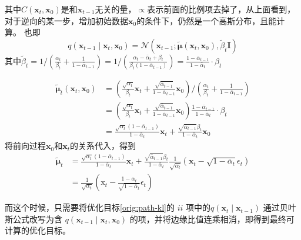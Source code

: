 其中$C\left(\mathbf{x}_t, \mathbf{x}_0\right)$是和$\mathbf{x}_{t-1}$无关的量，$\propto $表示前面的比例项去掉了，从上面看到，对于逆向的某一步，增加初始数据$\mathbf{x}_0$的条件下，仍然是一个高斯分布，且能计算。
也即
\begin{equation}
q\left(\mathbf{x}_{t-1} \mid \mathbf{x}_t, \mathbf{x}_0\right)=\mathcal{N}\left(\mathbf{x}_{t-1} ; \tilde{\boldsymbol{\mu}}\left(\mathbf{x}_t, \mathbf{x}_0\right), \tilde{\beta}_t \mathbf{I}\right)
\end{equation}
其中$\tilde{\beta}_t=1 /\left(\frac{\alpha_t}{\beta_t}+\frac{1}{1-\bar{\alpha}_{t-1}}\right)=1 /\left(\frac{\alpha_t-\bar{\alpha}_t+\beta_t}{\beta_t\left(1-\bar{\alpha}_{t-1}\right)}\right)=\frac{1-\bar{\alpha}_{t-1}}{1-\bar{\alpha}_t} \cdot \beta_t$

\begin{equation}
\begin{aligned}
\tilde{\boldsymbol{\mu}}_t\left(\mathbf{x}_t, \mathbf{x}_0\right) & =\left(\frac{\sqrt{\alpha_t}}{\beta_t} \mathbf{x}_t+\frac{\sqrt{\bar{\alpha}_{t-1}}}{1-\bar{\alpha}_{t-1}} \mathbf{x}_0\right) /\left(\frac{\alpha_t}{\beta_t}+\frac{1}{1-\bar{\alpha}_{t-1}}\right) \\
& =\left(\frac{\sqrt{\alpha_t}}{\beta_t} \mathbf{x}_t+\frac{\sqrt{\bar{\alpha}_{t-1}}}{1-\bar{\alpha}_{t-1}} \mathbf{x}_0\right) \frac{1-\bar{\alpha}_{t-1}}{1-\bar{\alpha}_t} \cdot \beta_t \\
& =\frac{\sqrt{\alpha_t}\left(1-\bar{\alpha}_{t-1}\right)}{1-\bar{\alpha}_t} \mathbf{x}_t+\frac{\sqrt{\bar{\alpha}_{t-1}} \beta_t}{1-\bar{\alpha}_t} \mathbf{x}_0
\end{aligned}
\end{equation}
将前向过程$\mathbf{x}_0$和$\mathbf{x}_t$的关系代入，得到
\begin{equation}
\begin{aligned}
\tilde{\boldsymbol{\mu}}_t & =\frac{\sqrt{\alpha_t}\left(1-\bar{\alpha}_{t-1}\right)}{1-\bar{\alpha}_t} \mathbf{x}_t+\frac{\sqrt{\bar{\alpha}_{t-1}} \beta_t}{1-\bar{\alpha}_t} \frac{1}{\sqrt{\bar{\alpha}_t}}\left(\mathbf{x}_t-\sqrt{1-\bar{\alpha}_t} \epsilon_t\right) \\
& =\frac{1}{\sqrt{\alpha_t}}\left(\mathrm{x}_t-\frac{1-\alpha_t}{\sqrt{1-\bar{\alpha}_t}} \epsilon_t\right)
\end{aligned}
\end{equation}

而这个时候，只需要将优化目标\eqref{orig:path-kl}的 $ii$ 项中的$q(\mathbf{x}_t \mid \mathbf{x}_{t-1})$
通过贝叶斯公式改写为含 $q(\mathbf{x}_{t-1}\mid\mathbf{x}_t,\mathbf{x}_0)$ 的项，并将边缘比值连乘相消，即得到最终可计算的优化目标。

